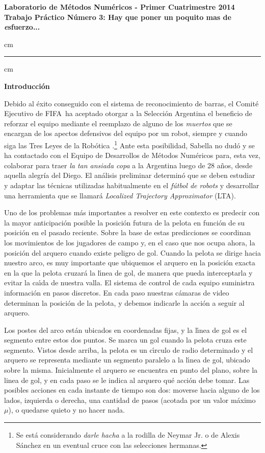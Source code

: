 \documentclass[11pt, a4paper]{article}
\begin{document}
\begin{centering}
\large\bf Laboratorio de M\'etodos Num\'ericos - Primer Cuatrimestre 2014 \\
\large\bf Trabajo Pr\'actico N\'umero 3: Hay que poner un poquito mas de \emph esfuerzo...\\
\end{centering}


 cm
\hrule
{} cm

{\bf\noindent Introducci\'on}

Debido al \'exito conseguido con el sistema de reconocimiento de barras, el Comit\'e Ejecutivo de FIFA\circledR\ ha aceptado
otorgar a la Selecci\'on Argentina el beneficio de reforzar el equipo mediante el reemplazo de alguno de los
\emph{muertos} que se encargan de los apectos defensivos del equipo por un robot, siempre y cuando siga las Tres Leyes
de la Rob\'otica \cite{asimov}.\footnote{Se est\'a considerando \emph{darle hacha} a la rodilla de Neymar Jr. o de Alexis
S\'anchez en un eventual cruce con las selecciones hermanas.} Ante esta posibilidad, Sabella no dud\'o y se ha
contactado con el Equipo de Desarrollos de M\'etodos Num\'ericos para, esta vez, colaborar para traer \emph{la tan
ansiada copa} a la Argentina luego de
28 a\~nos, desde aquella alegr\'ia del Diego. El an\'alisis preliminar determin\'o que se deben estudiar y adaptar las t\'ecnicas utilizadas habitualmente
en el \emph{f\'utbol de robots} y desarrollar una herramienta que se llamar\'a \emph{Localized Trajectory Approximator}
(LTA).

Uno de los problemas m\'as importantes a resolver en este contexto es
predecir con la mayor anticipaci\'on posible la posici\'on futura de la 
pelota en funci\'on de su posici\'on en el pasado reciente. Sobre la base
de estas predicciones se coordinan los movimientos de los jugadores de
campo y, en el caso que nos ocupa ahora, la posici\'on del arquero cuando
existe peligro de gol.
Cuando la pelota se dirige hacia nuestro arco, es muy importante que
ubiquemos el arquero en la posici\'on exacta en la que la pelota 
cruzar\'a la l\'\i nea de gol, de manera que pueda interceptarla y evitar
la ca\'{\i}da de nuestra valla. El sistema de control de cada equipo
suministra informaci\'on en pasos discretos. En cada paso nuestras
c\'amaras de video determinan la posici\'on de la pelota, y debemos
indicarle la acci\'on a seguir al arquero.

Los postes del arco est\'an ubicados en coordenadas fijas,
y la l\'\i nea de gol es el segmento entre estos dos puntos. Se marca
un gol cuando la pelota cruza este segmento. Vistos desde arriba, la pelota
es un c\'\i rculo de radio determinado y el arquero 
se representa mediante un segmento paralelo a la l\'\i nea de gol,
ubicado sobre la misma.
Inicialmente el arquero se encuentra en punto del plano, sobre la linea de gol, 
y en cada paso se le indica al arquero qu\'e acci\'on
debe tomar. Las posibles acciones en cada instante de tiempo son dos: moverse hacia alguno de los lados, izquierda o
derecha, una cantidad de pasos (acotada por un valor m\'aximo $\mu$), o quedarse quieto y no hacer nada.
\end{document}
